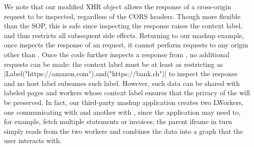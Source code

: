 We note that our modified XHR object allows the response of a
cross-origin request to be inspected, regardless of the CORS headers.
%
Though more flexible than the SOP, this is safe since inspecting the
response raises the context label, and thus restricts all subsequent
side effects.
%
Returning to our mashup example, once  inspects the
response of an  request, it cannot perform requests
to any origin other than .
%
Once the code further inspects a response from , no
additional requests can be made: the context label must be at least as
restricting as \js|Label("https://amazon.com").and("https://bank.ch")|
to inspect the response and no host label subsumes such label. 
%
However, such data can be shared with labeled pages and workers whose
context label ensures that the privacy of the will be preserved.
% 
In fact, our third-party mashup application creates two LWorkers, one
communicating with  and another with
, since the application may need to, for example, fetch
multiple statements or invoices; the parent iframe in turn simply
reads from the two workers and combines the data into a graph that the
user interacts with.
%







